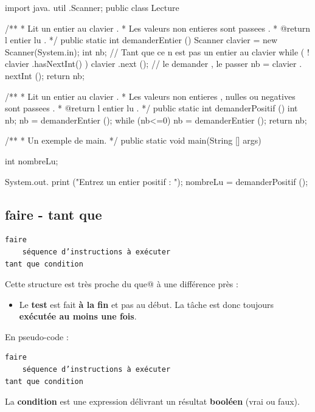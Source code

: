 \documentclass[11pt,a4paper]{article}
\begin{document}
            \par
        \begin{Java}
import java. util .Scanner;
public class Lecture {
    /**
    * Lit un entier au clavier .
    * Les valeurs non entieres sont passees .
    * @return l entier lu .
    */
    public static int demanderEntier () {
      Scanner clavier = new Scanner(System.in);
      int nb;
      // Tant que ce n  est pas un entier au clavier
      while ( ! clavier .hasNextInt() ) {
        clavier .next (); // le demander , le passer
      }
      nb = clavier . nextInt ();
      return nb;
    }

    /**
    * Lit un entier au clavier .
    * Les valeurs non entieres , nulles ou negatives sont passees .
    * @return l entier lu .
    */
    public static int demanderPositif () {
      int nb;
      nb = demanderEntier ();
      while (nb<=0) {
        nb = demanderEntier ();
      }
      return nb;
    }

    /**
    * Un exemple de main.
    */
    public static void main(String [] args){
      int nombreLu;
      
      System.out. print ("Entrez un entier  positif : ");
      nombreLu = demanderPositif ();
    }
}\end{Java}\subsection{faire - tant que}\begin{verbatim}
faire
    séquence d’instructions à exécuter
tant que condition
      \end{verbatim}
        Cette structure est tr\`es proche du \guillemotleft  \verb@tant que@ \guillemotright  \`a une diff\'erence pr\`es :
        
					\begin{itemize}
				
			\item 
            Le \textbf{test} est fait \textbf{\`a la fin} et pas au d\'ebut. 
            La t\^ache est donc toujours \textbf{ex\'ecut\'ee au moins une fois}.
          
					\end{itemize}
				
            \par
        En pseudo-code :
            \par
        \begin{verbatim}
faire
    séquence d’instructions à exécuter
tant que condition
      \end{verbatim}
        La \textbf{condition} est une expression d\'elivrant un r\'esultat 
        \textbf{bool\'een} (vrai ou faux).
      
\end{document}

